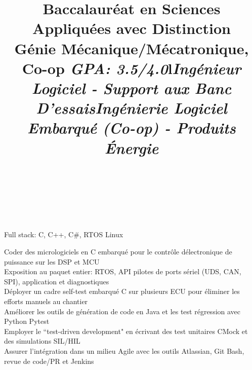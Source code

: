 \documentclass[mm]{res}
\begin{document}
\begin{resume}
\title{Baccalaur\'eat en Sciences Appliqu\'ees avec Distinction\\
G\'enie M\'ecanique/M\'ecatronique, Co-op \textsl{GPA: 3.5/4.0}}
\begin{position}
\end{position}


\toprule

\section{\headingexperience}
\begin{format}
\\
\title{l}\\
\body\\
\end{format}


\title{\textsl{Ing\'enieur Logiciel - Support aux Banc D'essais}}
\begin{position}
\tb Full stack: C, C++, C\#, RTOS Linux
\end{position}

\title{\textsl{Ing\'enierie Logiciel Embarqu\'e (Co-op) - Produits \'Energie}}
\begin{position}
\tb Coder des micrologiciels en C embarqu\'e pour le contr\^ole d\textquotesingle \'electronique de puissance sur les DSP et MCU\\
\tb Exposition au paquet entier: RTOS, API pilotes de ports s\'eriel (UDS, CAN, SPI), application et diagnostiques\\
\tb D\'eployer un cadre self-test embarqu\'e C sur plusieurs ECU pour \'eliminer les efforts manuels au chantier\\
\tb Am\'eliorer les outils de g\'en\'eration de code en Java et les test r\'egression avec Python Pytest\\
\tb Employer le ``test-driven development" en \'ecrivant des test unitaires CMock et des simulations SIL/HIL \\
\tb Assurer l'int\'egration dans un milieu Agile avec les outils Atlassian, Git Bash, revue de code/PR et Jenkins
\end{position}


\end{resume}
\end{document}
